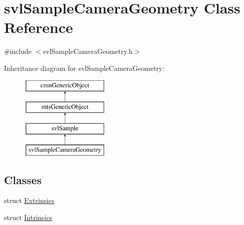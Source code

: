 \hypertarget{classsvl_sample_camera_geometry}{\section{svl\-Sample\-Camera\-Geometry Class Reference}
\label{classsvl_sample_camera_geometry}
}


{\ttfamily \#include $<$svl\-Sample\-Camera\-Geometry.\-h$>$}

Inheritance diagram for svl\-Sample\-Camera\-Geometry\-:\begin{figure}[H]
\begin{center}
\leavevmode
\includegraphics[height=4.000000cm]{d6/d93/classsvl_sample_camera_geometry}
\end{center}
\end{figure}
\subsection*{Classes}
\begin{DoxyCompactItemize}
\item 
struct \hyperlink{structsvl_sample_camera_geometry_1_1_extrinsics}{Extrinsics}
\item 
struct \hyperlink{structsvl_sample_camera_geometry_1_1_intrinsics}{Intrinsics}
\end{DoxyCompactItemize}
